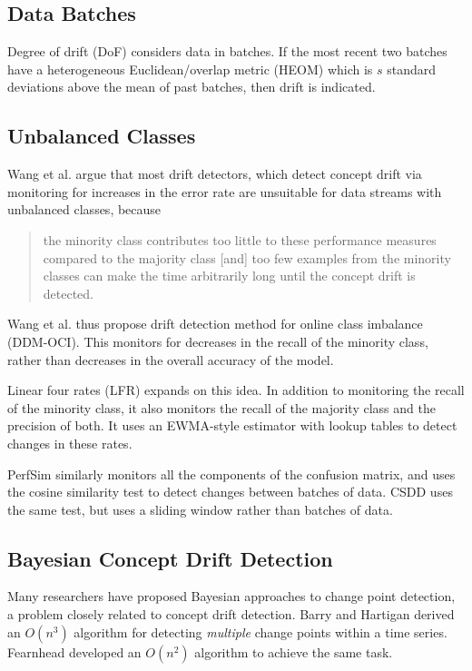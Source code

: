 \subsection{Data Batches}

Degree of drift (DoF) \cite{DoF} considers data in batches. If the most recent two batches have a heterogeneous Euclidean/overlap metric (HEOM) which is $s$ standard deviations above the mean of past batches, then drift is indicated.

\subsection{Unbalanced Classes}

Wang et al. \cite{DDM-OCIa}\cite{DDM-OCIb} argue that most drift detectors, which detect concept drift via monitoring for increases in the error rate are unsuitable for data streams with unbalanced classes, because
\begin{quote}
  the  minority class  contributes  too  little  to  these  performance  measures compared  to  the  majority  class [and]  too  few  examples from the minority classes can make the time arbitrarily long until  the  concept  drift  is  detected.
\end{quote}
Wang et al. thus propose drift detection method for online class imbalance (DDM-OCI). This monitors for decreases in the recall of the minority class, rather than decreases in the overall accuracy of the model.

Linear four rates (LFR) \cite{LFR} expands on this idea. In addition to monitoring the recall of the minority class, it also monitors the recall of the majority class and the precision of both. It uses an EWMA-style \cite{EWMA} estimator with lookup tables to detect changes in these rates.

PerfSim \cite{perfsim} similarly monitors all the components of the confusion matrix, and uses the cosine similarity test to detect changes between batches of data. CSDD \cite{CSDD} uses the same test, but uses a sliding window rather than batches of data.

\subsection{Bayesian Concept Drift Detection}

Many researchers have proposed Bayesian approaches to change point detection, a problem closely related to concept drift detection. Barry and Hartigan \cite{barry_hartigan} derived an $O(n^3)$ algorithm for detecting {\it multiple} change points within a time series. Fearnhead \cite{fearnhead} developed an $O(n^2)$ algorithm to achieve the same task. 


